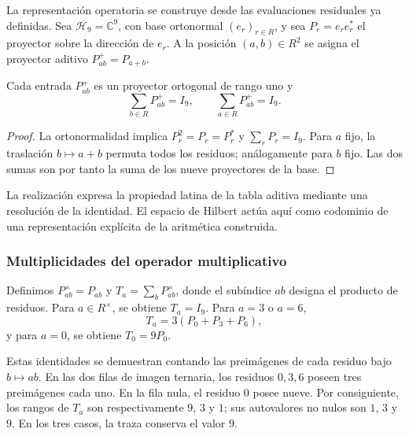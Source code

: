 La representación operatoria se construye desde las evaluaciones residuales ya definidas. Sea $\mathcal H_9=\mathbb C^9$, con base ortonormal $(e_r)_{r\in R}$, y sea $P_r=e_re_r^*$ el proyector sobre la dirección de $e_r$. A la posición $(a,b)\in R^2$ se asigna el proyector aditivo $P^+_{ab}=P_{a+b}$.

\begin{bloqueindivisible}
\begin{proposicion}
\label{prop:app-aditivo-operador}
Cada entrada $P^+_{ab}$ es un proyector ortogonal de rango uno y
\begin{equation}
 \sum_{b\in R}P^+_{ab}=I_9,
 \qquad \sum_{a\in R}P^+_{ab}=I_9.
\end{equation}
\end{proposicion}

\begin{proof}
La ortonormalidad implica $P_r^2=P_r=P_r^*$ y $\sum_rP_r=I_9$. Para $a$ fijo, la traslación $b\mapsto a+b$ permuta todos los residuos; análogamente para $b$ fijo. Las dos sumas son por tanto la suma de los nueve proyectores de la base.
\end{proof}
\end{bloqueindivisible}

La realización expresa la propiedad latina de la tabla aditiva mediante una resolución de la identidad. El espacio de Hilbert actúa aquí como codominio de una representación explícita de la aritmética construida.

\subsubsection{Multiplicidades del operador multiplicativo}

Definimos $P^\times_{ab}=P_{ab}$ y $T_a=\sum_bP^\times_{ab}$, donde el subíndice $ab$ designa el producto de residuos. Para $a\in R^\times$, se obtiene $T_a=I_9$. Para $a=3$ o $a=6$,
\begin{equation}
 T_a=3(P_0+P_3+P_6),
\end{equation}
y para $a=0$, se obtiene $T_0=9P_0$.

Estas identidades se demuestran contando las preimágenes de cada residuo bajo $b\mapsto ab$. En las dos filas de imagen ternaria, los residuos $0,3,6$ poseen tres preimágenes cada uno. En la fila nula, el residuo $0$ posee nueve. Por consiguiente, los rangos de $T_a$ son respectivamente $9$, $3$ y $1$; sus autovalores no nulos son $1$, $3$ y $9$. En los tres casos, la traza conserva el valor $9$.

